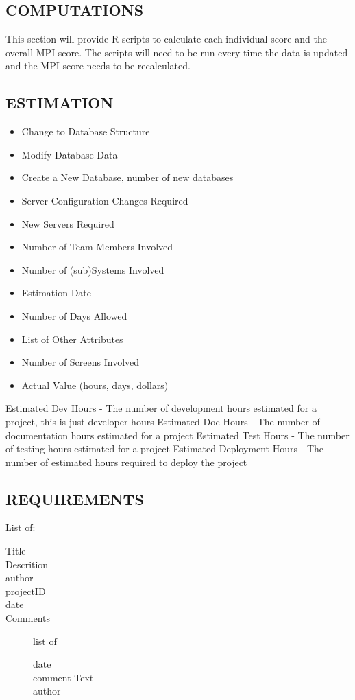 \documentclass[SDSUThesis.tex]{subfiles}
\begin{document}
\subsection{COMPUTATIONS}
    This section will provide R scripts to calculate each individual score and the overall 
    MPI score. The scripts will need to be run every time the data is updated and the MPI
    score needs to be recalculated.


    \subsection{ESTIMATION}
    
    \begin{itemize}
    \item Change to Database Structure  
    \item Modify Database Data    
    \item Create a New Database, number of new databases  
    \item Server Configuration Changes Required   
    \item New Servers Required   
    \item Number of Team Members Involved  
    \item Number of (sub)Systems Involved  
    \item Estimation Date
    \item Number of Days Allowed
    \item List of Other Attributes
    \item Number of Screens Involved 
    \item Actual Value (hours, days, dollars) 
    \end{itemize}
    
    
    Estimated Dev Hours - The number of development hours estimated for a project, this is just developer hours
    Estimated Doc Hours - The number of documentation hours estimated for a project
    Estimated Test Hours - The number of testing hours estimated for a project
    Estimated Deployment Hours - The number of estimated hours required to deploy the project
    
    \subsection{REQUIREMENTS}
    List of: 
    \begin{description}
      \item[Title] 
      \item[Descrition]
      \item[author]
      \item[projectID]
      \item[date]
      \item[Comments] list of \\
      \begin{description}
        \item[date]
        \item[comment Text]
        \item[author]
      \end{description}
    \end{description}
    
\end{document}
